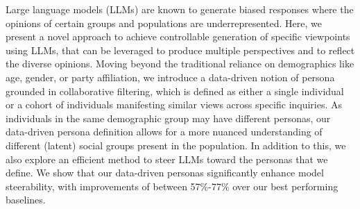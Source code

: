 Large language models (LLMs) are known to generate biased responses where the opinions of certain groups and populations are underrepresented. Here, we present a novel approach to achieve controllable generation of specific viewpoints using LLMs, that can be leveraged to produce multiple perspectives and to reflect the diverse opinions. Moving beyond the traditional reliance on demographics like age, gender, or party affiliation, we introduce a data-driven notion of persona grounded in collaborative filtering, which is defined as either a single individual or a cohort of individuals manifesting similar views across specific inquiries. As individuals in the same demographic group may have different personas, our data-driven persona definition allows for a more nuanced understanding of different (latent) social groups present in the population. In addition to this, we also explore an efficient method to steer LLMs toward the personas that we define. We show that our data-driven personas significantly enhance model steerability, with improvements of between 57\%-77\% over our best performing baselines.